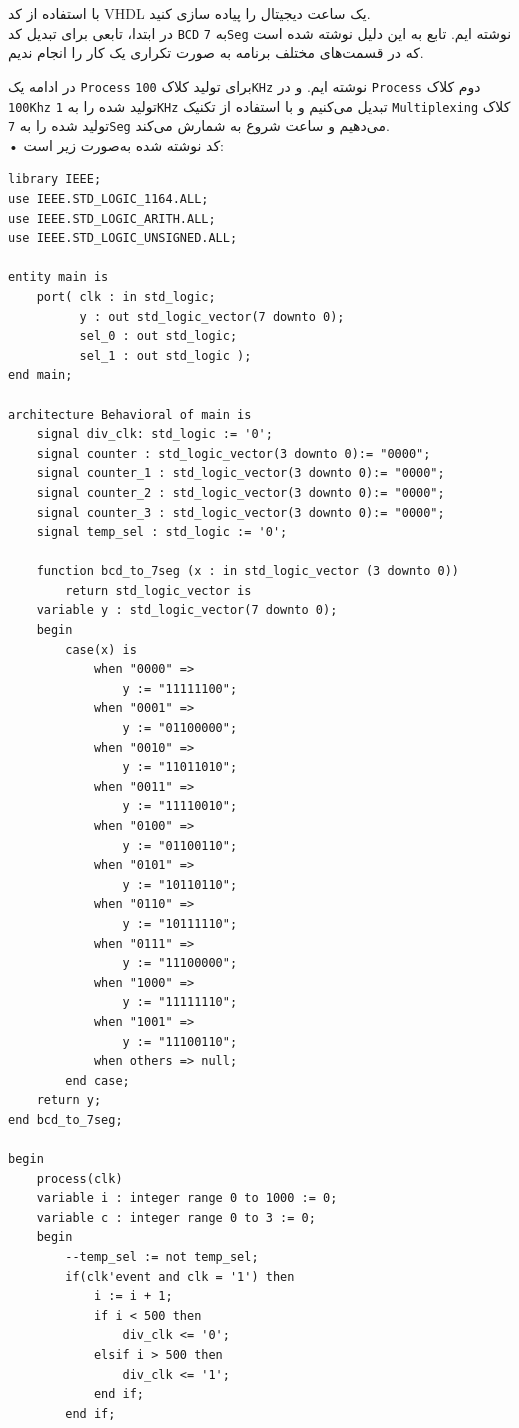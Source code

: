 \documentclass[12pt]{exam}
\begin{document}
\begin{questions}

\question
با استفاده از کد VHDL یک ساعت دیجیتال را پیاده سازی کنید. \\

در ابتدا، تابعی برای تبدیل کد \texttt{BCD} به \texttt{7Seg} نوشته ایم. تابع به این دلیل نوشته شده است که در قسمت‌های مختلف برنامه به صورت تکراری یک کار را انجام ندیم.

 در ادامه یک \texttt{Process} برای تولید کلاک \texttt{100KHz} نوشته ایم. و در \texttt{Process}
دوم کلاک \texttt{100Khz} تولید شده را به \texttt{1KHz} تبدیل می‌کنیم و با استفاده از تکنیک \texttt{Multiplexing} کلاک تولید شده را به \texttt{7Seg} می‌دهیم و ساعت شروع به شمارش می‌کند.\\


• کد نوشته شده به‌صورت زیر است: 
\begin{latin}
\begin{lstlisting}[style=vhdl,caption={Sourse code}]
library IEEE;
use IEEE.STD_LOGIC_1164.ALL;
use IEEE.STD_LOGIC_ARITH.ALL;
use IEEE.STD_LOGIC_UNSIGNED.ALL;

entity main is
	port( clk : in std_logic;
		  y : out std_logic_vector(7 downto 0);
		  sel_0 : out std_logic;
		  sel_1 : out std_logic );
end main;

architecture Behavioral of main is
	signal div_clk: std_logic := '0';
	signal counter : std_logic_vector(3 downto 0):= "0000";
	signal counter_1 : std_logic_vector(3 downto 0):= "0000";
	signal counter_2 : std_logic_vector(3 downto 0):= "0000";
	signal counter_3 : std_logic_vector(3 downto 0):= "0000";
	signal temp_sel : std_logic := '0';

	function bcd_to_7seg (x : in std_logic_vector (3 downto 0))  
		return std_logic_vector is
	variable y : std_logic_vector(7 downto 0);
	begin 
		case(x) is
			when "0000" =>
				y := "11111100";
			when "0001" =>
				y := "01100000";
			when "0010" => 
				y := "11011010";
			when "0011" => 
				y := "11110010";
			when "0100" => 
				y := "01100110";
			when "0101" => 
				y := "10110110";
			when "0110" => 
				y := "10111110";
			when "0111" => 
				y := "11100000";
			when "1000" => 
				y := "11111110";
			when "1001" => 
				y := "11100110";
			when others => null;
		end case;
	return y;
end bcd_to_7seg;

begin
	process(clk)
	variable i : integer range 0 to 1000 := 0;
	variable c : integer range 0 to 3 := 0;
	begin
		--temp_sel := not temp_sel;
		if(clk'event and clk = '1') then
			i := i + 1;
			if i < 500 then
				div_clk <= '0';
			elsif i > 500 then
				div_clk <= '1';
			end if;
		end if;


\end{lstlisting}
\end{latin}
\end{questions}
\end{document}
